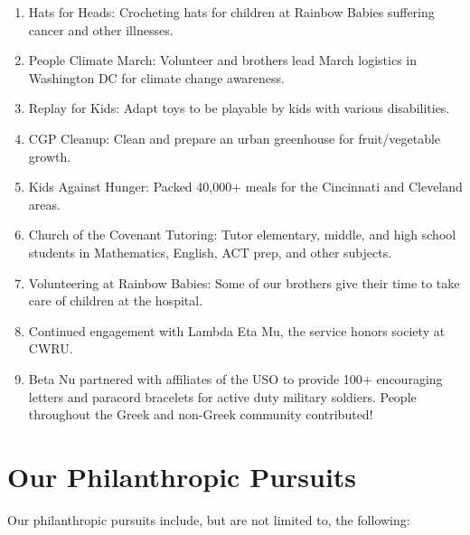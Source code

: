       \begin{enumerate}
      	\item Hats for Heads: Crocheting hats for children at Rainbow Babies suffering cancer and other illnesses.
      	
      	\item People Climate March: Volunteer and brothers lead March logistics in Washington DC for climate change awareness.
      	
      	\item Replay for Kids: Adapt toys to be playable by kids with various disabilities.
      	
      	\item CGP Cleanup: Clean and prepare an urban greenhouse for fruit/vegetable growth.
      	
      	\item Kids Against Hunger: Packed 40,000+ meals for the Cincinnati and Cleveland areas.
      	
      	\item Church of the Covenant Tutoring: Tutor elementary, middle, and high school students in Mathematics, English, ACT prep, and other subjects.
      	
      	\item Volunteering at Rainbow Babies: Some of our brothers give their time to take care of children at the hospital.
      	
      	\item Continued engagement with Lambda Eta Mu, the service honors society at CWRU.
      	
      	\item Beta Nu partnered with affiliates of the USO to provide 100+ encouraging letters and paracord bracelets for active duty military soldiers. People throughout the Greek and non-Greek community contributed!
      \end{enumerate}
      
    \section*{Our Philanthropic Pursuits}
      Our philanthropic pursuits include, but are not limited to, the following:
      

